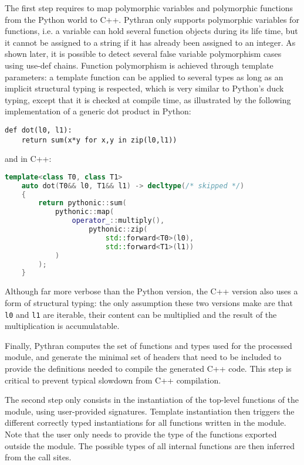\documentclass[10pt, onecolumn, preprint]{sigplanconf}
\begin{document}
The first step requires to map polymorphic variables and polymorphic functions
from the Python world to C++. Pythran only supports polymorphic variables for
functions, i.e. a variable can hold several function objects during its life
time, but it cannot be assigned to a string if it has already been assigned to
an integer. As shown later, it is possible to detect several false variable
polymorphism cases using use-def chains. Function polymorphism is achieved
through template parameters: a template function can be applied to several
types as long as an implicit structural typing is respected, which is very
similar to Python's duck typing, except that it is checked at compile time, as
illustrated by the following implementation of a generic dot product in Python:

\begin{lstlisting}
def dot(l0, l1):
    return sum(x*y for x,y in zip(l0,l1))
\end{lstlisting}

\noindent and in C++:

\begin{lstlisting}[language=c++]
template<class T0, class T1>
    auto dot(T0&& l0, T1&& l1) -> decltype(/* skipped */)
    {
        return pythonic::sum(
            pythonic::map(
                operator_::multiply(),
                    pythonic::zip(
                        std::forward<T0>(l0),
                        std::forward<T1>(l1))
            )
        );
    }
\end{lstlisting}

Although far more verbose than the Python version, the C++ version also uses a
form of structural typing: the only assumption these two versions make are that
\texttt{l0} and \texttt{l1} are iterable, their content can be multiplied and the result of
the multiplication is accumulatable.

Finally, Pythran computes the set of functions and types used for the processed
module, and generate the minimal set of headers that need to be included to
provide the definitions needed to compile the generated C++ code. This step is
critical to prevent typical slowdown from C++ compilation.

The second step only consists in the instantiation of the top-level functions of the
module, using user-provided signatures. Template instantiation then triggers the
different correctly typed instantiations for all functions written in the
module. Note that the user only needs to provide the type of the functions
exported outside the module. The possible types of all internal functions are
then inferred from the call sites.
\end{document}
